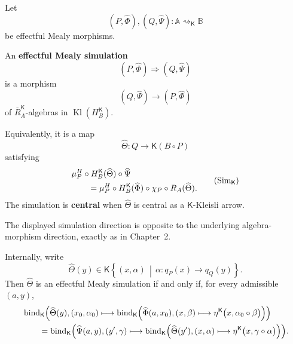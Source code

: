 Let
\[
    (P,\widehat\Phi),
    (Q,\widehat\Psi):
    \mathbb A\rightsquigarrow_{\mathsf K}\mathbb B
\]
be effectful Mealy morphisms.

\begin{definition}
\label{def:effectful-mealy-simulation}
An \textbf{effectful Mealy simulation}
\[
    (P,\widehat\Phi)
    \Rightarrow
    (Q,\widehat\Psi)
\]
is a morphism
\[
    (Q,\widehat\Psi)
    \longrightarrow
    (P,\widehat\Phi)
\]
of \(\overline R_A^{\mathsf K}\)-algebras in
\(\operatorname{Kl}(H_B^{\mathsf K})\).

Equivalently, it is a map
\[
    \widehat\Theta:
    Q\longrightarrow\mathsf K(B\circ P)
\]
satisfying
\[
\begin{aligned}
&
\mu^H_P
\circ
H_B^{\mathsf K}(\widehat\Theta)
\circ
\widehat\Psi
\\
&\qquad=
\mu^H_P
\circ
H_B^{\mathsf K}(\widehat\Phi)
\circ
\chi_P
\circ
R_A(\widehat\Theta).
\end{aligned}
\tag{\(\mathrm{Sim}_{\mathsf K}\)}
\]
The simulation is \textbf{central} when \(\widehat\Theta\) is central as a
\(\mathsf K\)-Kleisli arrow.
\end{definition}

The displayed simulation direction is opposite to the underlying
algebra-morphism direction, exactly as in Chapter~2.

\begin{proposition}
\label{prop:effectful-simulation-component-equation}
Internally, write
\[
    \widehat\Theta(y)
    \in
    \mathsf K
    \left\{
        (x,\alpha)
        \,\middle|\,
        \alpha:q_P(x)\to q_Q(y)
    \right\}.
\]
Then \(\widehat\Theta\) is an effectful Mealy simulation if and only if, for
every admissible \((a,y)\),
\[
\begin{aligned}
&
\operatorname{bind}_{\mathsf K}
\Bigl(
    \widehat\Theta(y),
    (x_0,\alpha_0)
    \longmapsto
    \operatorname{bind}_{\mathsf K}
    \Bigl(
        \widehat\Phi(a,x_0),
        (x,\beta)
        \longmapsto
        \eta^{\mathsf K}
        \bigl(
            x,
            \alpha_0\circ\beta
        \bigr)
    \Bigr)
\Bigr)
\\
&\qquad=
\operatorname{bind}_{\mathsf K}
\Bigl(
    \widehat\Psi(a,y),
    (y',\gamma)
    \longmapsto
    \operatorname{bind}_{\mathsf K}
    \Bigl(
        \widehat\Theta(y'),
        (x,\alpha)
        \longmapsto
        \eta^{\mathsf K}
        \bigl(
            x,
            \gamma\circ\alpha
        \bigr)
    \Bigr)
\Bigr).
\end{aligned}
\]
\end{proposition}

